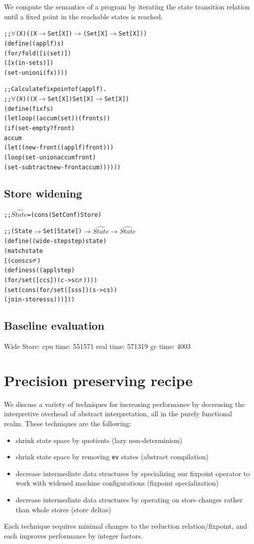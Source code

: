 \documentclass[preprint,onecolumn,9pt]{sigplanconf} %
\begin{document}
We compute the semantics of a program by iterating the state
transition relation until a fixed point in the reachable states is
reached.

\begin{alltt}
;; \(\forall\) (X) ((X \(\to\) Set[X]) \(\to\) (Set[X] \(\to\) Set[X]))
(define ((appl f) s)
  (for/fold ([i (set)])
    ([x (in-set s)])
    (set-union i (f x))))

;; Calculate fixpoint of (appl f).
;; \(\forall\) (X) ((X \(\to\) Set[X]) Set[X] \(\to\) Set[X])
(define (fix f s)
  (let loop ((accum (set)) (front s))
    (if (set-empty? front)
        accum
        (let ((new-front ((appl f) front)))
          (loop (set-union accum front)
                (set-subtract new-front accum))))))
\end{alltt}

\subsection{Store widening}

\begin{alltt}
;; \(\widehat{State}\) = (cons (Set Conf) Store)

;; (State \(\to\) Set[State]) \(\to\) \(\widehat{State}\) \(\to\) \(\widehat{State}\)
(define ((wide-step step) state)
  (match state
    [(cons cs \(\msto\))
     (define ss ((appl step)
                 (for/set ([c cs]) (c->s c \(\msto\)))))
     (set (cons (for/set ([s ss]) (s->c s))
                (join-stores ss)))]))
\end{alltt}

\subsection{Baseline evaluation}

Wide Store: cpu time: 551571 real time: 571319 gc time: 4003

\section{Precision preserving recipe}

We discuss a variety of techniques for increasing performance by
decreasing the interpretive overhead of abstract interpretation, all
in the purely functional realm. These techniques are the following:
\begin{itemize}
 \item{shrink state space by quotients (lazy non-determinism)}
 \item{shrink state space by removing {\tt ev} states (abstract
   compilation)}
 \item{decrease intermediate data structures by specializing our
fixpoint operator to work with widened machine configurations
(fixpoint specialization)}
 \item{decrease intermediate data structures by operating on store
   changes rather than whole stores (store deltas)}
\end{itemize}
Each technique requires minimal changes to the reduction
relation/fixpoint, and each improves performance by integer factors.
\end{document}
